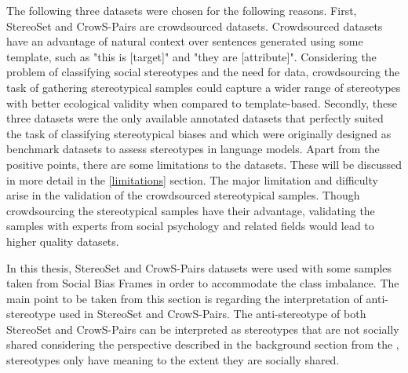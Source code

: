 The following three datasets were chosen for the following reasons. First, StereoSet and CrowS-Pairs are crowdsourced datasets. Crowdsourced datasets have an advantage of natural context over sentences generated using some template, such as "this is [target]" and "they are [attribute]"\cite{nadeem2020stereoset}. Considering the problem of classifying social stereotypes and the need for data, crowdsourcing the task of gathering stereotypical samples could capture a wider range of stereotypes with better ecological validity when compared to template-based. Secondly, these three datasets were the only available annotated datasets that perfectly suited the task of classifying stereotypical biases and which were originally designed as benchmark datasets to assess stereotypes in language models. Apart from the positive points, there are some limitations to the datasets. These will be discussed in more detail in the \ref{limitations} section. The major limitation and difficulty arise in the validation of the crowdsourced stereotypical samples. Though crowdsourcing the stereotypical samples have their advantage, validating the samples with experts from social psychology and related fields would lead to higher quality datasets\cite{blodgett2021stereotyping}.

In this thesis, StereoSet and CrowS-Pairs datasets were used with some samples taken from Social Bias Frames in order to accommodate the class imbalance. The main point to be taken from this section is regarding the interpretation of anti-stereotype used in StereoSet and CrowS-Pairs. The anti-stereotype of both StereoSet and CrowS-Pairs can be interpreted as stereotypes that are not socially shared considering the perspective described in the background section from the \cite{macrae1996stereotypes}, stereotypes only have meaning to the extent they are socially shared.
